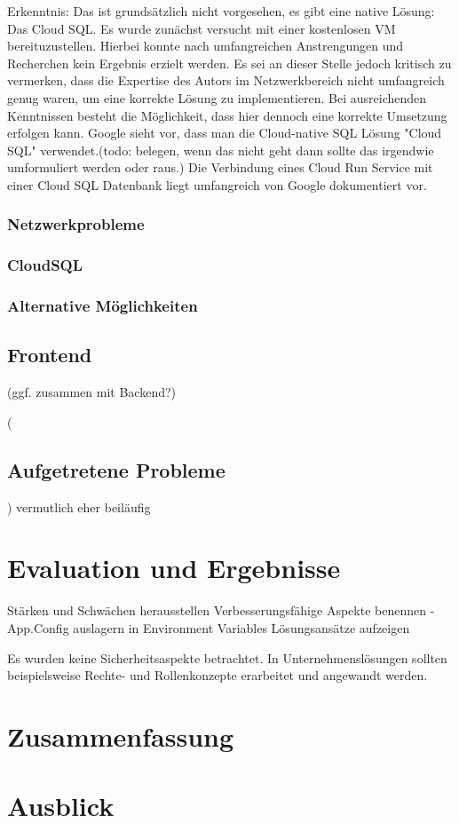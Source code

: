 \documentclass[pdftex,a4paper,abstracton,11pt,parskip=half,bibtotocnumbered]{scrartcl}
\begin{document}
	
		Erkenntnis: Das ist grundsätzlich nicht vorgesehen, es gibt eine native Lösung: Das Cloud SQL. Es wurde zunächst versucht mit einer kostenlosen
		VM bereituzustellen. Hierbei konnte nach umfangreichen Anstrengungen und Recherchen kein Ergebnis erzielt werden. Es sei an dieser Stelle jedoch
		kritisch zu vermerken, dass die Expertise des Autors im Netzwerkbereich nicht umfangreich genug waren, um eine korrekte Lösung zu implementieren.
		Bei ausreichenden Kenntnissen besteht die Möglichkeit, dass hier dennoch eine korrekte Umsetzung erfolgen kann. Google sieht vor, dass man die
		Cloud-native SQL Lösung "Cloud SQL" verwendet.(todo: belegen, wenn das nicht geht dann sollte das irgendwie umformuliert werden oder raus.)
		Die Verbindung eines Cloud Run Service mit einer Cloud SQL Datenbank liegt umfangreich von Google dokumentiert vor. 

		\subsubsection{Netzwerkprobleme}
		\subsubsection{CloudSQL}
		
		\subsubsection{Alternative Möglichkeiten}
	\subsection{Frontend} (ggf. zusammen mit Backend?)

	(\subsection{Aufgetretene Probleme}) vermutlich eher beiläufig

\section{Evaluation und Ergebnisse}
	Stärken und Schwächen herausstellen
	Verbesserungsfähige Aspekte benennen 
		- App.Config auslagern in Environment Variables
	Lösungsansätze aufzeigen

	Es wurden keine Sicherheitsaspekte betrachtet. In Unternehmenslösungen sollten beispielsweise Rechte- und Rollenkonzepte erarbeitet und angewandt werden.
\section{Zusammenfassung}

\section{Ausblick}

%

\printbibliography
\end{document}
